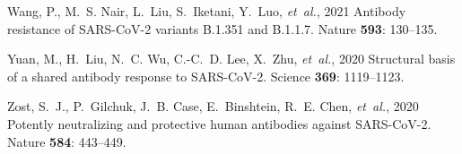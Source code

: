 \documentclass[9pt,twocolumn,twoside]{gsajnl_modified}
\begin{document}
{\begin{thebibliography}{30}
{Wang, P., M.~S. Nair, L.~Liu, S.~Iketani, Y.~Luo, {\em et~al.\/}}, 2021
  Antibody resistance of {SARS-CoV-2} variants {B.1.351} and {B.1.1.7}. Nature
  {\bf 593}: 130--135.

{Yuan, M., H.~Liu, N.~C. Wu, C.-C.~D. Lee, X.~Zhu, {\em et~al.\/}}, 2020
  Structural basis of a shared antibody response to {SARS-CoV-2}. Science {\bf
  369}: 1119--1123.

{Zost, S.~J., P.~Gilchuk, J.~B. Case, E.~Binshtein, R.~E. Chen, {\em
  et~al.\/}}, 2020 Potently neutralizing and protective human antibodies
  against {SARS-CoV-2}. Nature {\bf 584}: 443--449.

\end{thebibliography}

}
\end{document}
